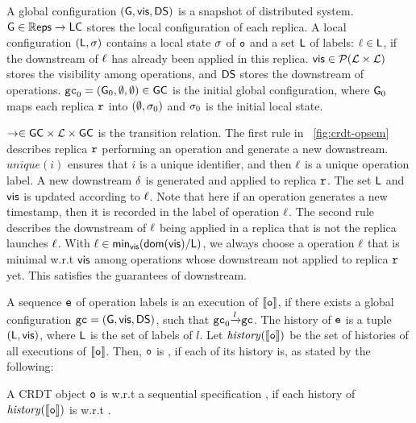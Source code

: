 A global configuration $(\mathsf{G}, \mathsf{vis}, \mathsf{DS})$ is a snapshot of distributed system. $\mathsf{G} \in \mathbb{R}\mathsf{eps} \rightarrow \mathsf{LC}$ stores the local configuration of each replica. A local configuration $(\mathsf{L}, \sigma)$ contains a local state $\sigma$ of $\mathtt{o}$ and a set $\mathsf{L}$ of labels: $\ell \in \mathsf{L}$, if the downstream of $\ell$ has already been applied in this replica. $\mathsf{vis} \in \mathcal{P}(\mathcal{L} \times \mathcal{L})$ stores the visibility among operations, and $\mathsf{DS}$ stores the downstream of operations. $\mathtt{gc}_0 = (\mathsf{G}_0, \emptyset, \emptyset) \in \mathsf{GC}$ is the initial global configuration, where $\mathsf{G}_0$ maps each replica $\mathtt{r}$ into $(\emptyset, \sigma_0)$ and $\sigma_0$ is the initial local state. 

$\rightarrow \in \mathsf{GC} \times \mathcal{L} \times \mathsf{GC}$ is the transition relation. The first rule in \figurename~\ref{fig:crdt-opsem} describes replica $\mathtt{r}$ performing an operation and generate a new downstream. $\mathit{unique}(i)$ ensures that $i$ is a unique identifier, and then $\ell$ is a unique operation label. A new downstream $\delta$ is generated and applied to replica $\mathtt{r}$. The set $\mathsf{L}$ and $\mathsf{vis}$ is updated according to $\ell$. Note that here if an operation generates a new timestamp, then it is recorded in the label of operation $\ell$. The second rule describes the downstream of $\ell$ being applied in a replica that is not the replica launches $\ell$. With $\ell \in \mathsf{min}_{\mathsf{vis}}(\mathsf{dom}(\mathsf{vis}) / \mathsf{L})$, we always choose a operation $\ell$ that is minimal w.r.t $\mathsf{vis}$ among operations whose downstream not applied to replica $\mathtt{r}$ yet. This satisfies the guarantees of downstream.


A sequence $\mathtt{e}$ of operation labels is an execution of $\llbracket \mathtt{o} \rrbracket$, if there exists a global configuration $\mathtt{gc} = (\mathsf{G}, \mathsf{vis}, \mathsf{DS})$, such that $\mathtt{gc}_0 {\xrightarrow{ l }} \mathtt{gc}$. The history of $\mathtt{e}$ is a tuple $(\mathsf{L}, \mathsf{vis})$, where $\mathsf{L}$ is the set of labels of $l$. Let $\mathit{history}(\llbracket \mathtt{o} \rrbracket)$ be the set of histories of all executions of $\llbracket \mathtt{o} \rrbracket$. Then, $\mathtt{o}$ is \crdtlinearizable{}, if each of its history is, as stated by the following:

\begin{definition}
\label{definition:correctness of a CRDT object}
A CRDT object $\mathtt{o}$ is \crdtlinearizable{} w.r.t a sequential specification \Spec{}, if each history of $\mathit{history}(\llbracket \mathtt{o} \rrbracket)$ is \crdtlinearizable{} w.r.t \Spec{}.
\end{definition}

